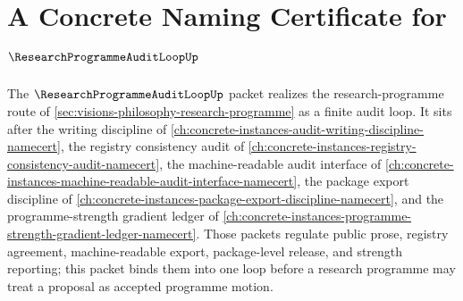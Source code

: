 \chapter{A Concrete Naming Certificate for $\ResearchProgrammeAuditLoopUp$}
\label{ch:concrete-instances-research-programme-audit-loop-namecert}

The $\ResearchProgrammeAuditLoopUp$ packet realizes the research-programme route of \autoref{sec:visions-philosophy-research-programme} as a finite audit loop. It sits after the writing discipline of \autoref{ch:concrete-instances-audit-writing-discipline-namecert}, the registry consistency audit of \autoref{ch:concrete-instances-registry-consistency-audit-namecert}, the machine-readable audit interface of \autoref{ch:concrete-instances-machine-readable-audit-interface-namecert}, the package export discipline of \autoref{ch:concrete-instances-package-export-discipline-namecert}, and the programme-strength gradient ledger of \autoref{ch:concrete-instances-programme-strength-gradient-ledger-namecert}. Those packets regulate public prose, registry agreement, machine-readable export, package-level release, and strength reporting; this packet binds them into one loop before a research programme may treat a proposal as accepted programme motion.

